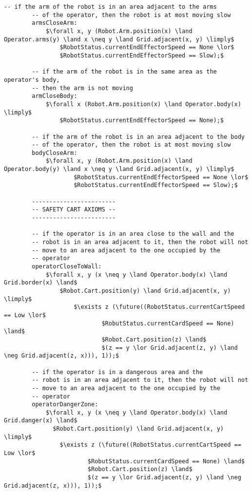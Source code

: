 \begin{lstlisting}[fontadjust, mathescape, frame=single]
        -- if the arm of the robot is in an area adjacent to the arms
        -- of the operator, then the robot is at most moving slow
        armsCloseArm:
            $\forall x, y (Robot.Arm.position(x) \land Operator.arms(y) \land x \neq y \land Grid.adjacent(x, y) \limply$
                $RobotStatus.currentEndEffectorSpeed == None \lor$
                $RobotStatus.currentEndEffectorSpeed == Slow);$

        -- if the arm of the robot is in the same area as the operator's body,
        -- then the arm is not moving
        armCloseBody:
            $\forall x (Robot.Arm.position(x) \land Operator.body(x) \limply$
                $RobotStatus.currentEndEffectorSpeed == None);$

        -- if the arm of the robot is in an area adjacent to the body
        -- of the operator, then the robot is at most moving slow
        bodyCloseArm:
            $\forall x, y (Robot.Arm.position(x) \land Operator.body(y) \land x \neq y \land Grid.adjacent(x, y) \limply$
                    $RobotStatus.currentEndEffectorSpeed == None \lor$
                    $RobotStatus.currentEndEffectorSpeed == Slow);$

        ------------------------       
        -- SAFETY CART AXIOMS --
        ------------------------

        -- if the operator is in an area close to the wall and the
        -- robot is in an area adjacent to it, then the robot will not
        -- move to an area adjacent to the one occupied by the
        -- operator
        operatorCloseToWall:
            $\forall x, y (x \neq y \land Operator.body(x) \land Grid.border(x) \land$
                $Robot.Cart.position(y) \land Grid.adjacent(x, y) \limply$
                    $\exists z (\future((RobotStatus.currentCartSpeed == Low \lor$
                            $RobutStatus.currentCardSpeed == None) \land$
                            $Robot.Cart.position(z) \land$
                            $(z == y \lor Grid.adjacent(z, y) \land \neg Grid.adjacent(z, x))), 1));$

        -- if the operator is in a dangerous area and the
        -- robot is in an area adjacent to it, then the robot will not
        -- move to an area adjacent to the one occupied by the
        -- operator
        operatorDangerZone:
            $\forall x, y (x \neq y \land Operator.body(x) \land Grid.danger(x) \land$
              $Robot.Cart.position(y) \land Grid.adjacent(x, y) \limply$
                $\exists z (\future((RobotStatus.currentCartSpeed == Low \lor$
                        $RobutStatus.currentCardSpeed == None) \land$
                        $Robot.Cart.position(z) \land$
                        $(z == y \lor Grid.adjacent(z, y) \land \neg Grid.adjacent(z, x))), 1));$



\end{lstlisting}
